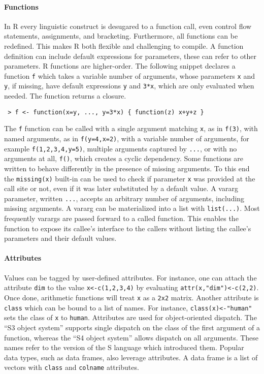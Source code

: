 \documentclass[review,nonacm,screen,acmsmall,anonymous=true]{acmart}
\newcommand{\code}[1]{\lstinline |#1|\xspace}
\renewcommand{\c}[1]{\lstinline |#1|\xspace}
\begin{document}
\paragraph{Functions}
In R every linguistic construct is desugared to a function call, even control
flow statements, assignments, and bracketing. Furthermore, all functions can be
redefined. This makes R both flexible and challenging to compile. A function
definition can include default expressions for parameters, these can refer to
other parameters. R functions are higher-order. The following snippet declares a
function \code f which takes a variable number of arguments, whose parameters
\code x and \code y, if missing, have default expressions \code y and
\code{3*x}, which are only evaluated when needed. The function returns a closure.
\begin{lstlisting}
 > f <- function(x=y, ..., y=3*x) { function(z) x+y+z }
\end{lstlisting}\vspace{1mm}
\noindent
The \code f function can be called with a single argument matching \code x, as in
\code{f(3)}, with named arguments, as in \code{f(y=4,x=2)}, with a variable
number of arguments, for example \code{f(1,2,3,4,y=5)}, multiple arguments
captured by \code{...}, or with no arguments at all, \code{f()}, which creates a
cyclic dependency. Some functions are written to behave differently in the
presence of missing arguments. To this end the \c{missing(x)} built-in can be
used to check if parameter \code{x} was provided at the call site or not, even
if it was later substituted by a default value. A vararg parameter, written
\code{...}, accepts an arbitrary number of arguments, including missing
arguments. A vararg can be materialized into a list with \code{list(...)}. Most
frequently varargs are passed forward to a called function. This enables the
function to expose its callee's interface to the callers without listing the
callee's parameters and their default values.

\paragraph{Attributes}
Values can be tagged by user-defined attributes. For instance, one can attach
the attribute \code{dim} to the value \code{x<-c(1,2,3,4)} by evaluating
\code{attr(x,"dim")<-c(2,2)}. Once done, arithmetic functions will treat \code x
as a \code{2x2} matrix. Another attribute is \code{class} which can be bound to
a list of names. For instance, \code{class(x)<-"human"} sets the class of
\code{x} to \code{human}. Attributes are used for object-oriented dispatch. The
``S3 object system'' supports single dispatch on the class of the first argument
of a function, whereas the ``S4 object system'' allows dispatch on all
arguments. These names refer to the version of the S language which introduced
them. Popular data types, such as data frames, also leverage attributes. A data
frame is a list of vectors with \code{class} and \code{colname} attributes.
\end{document}
